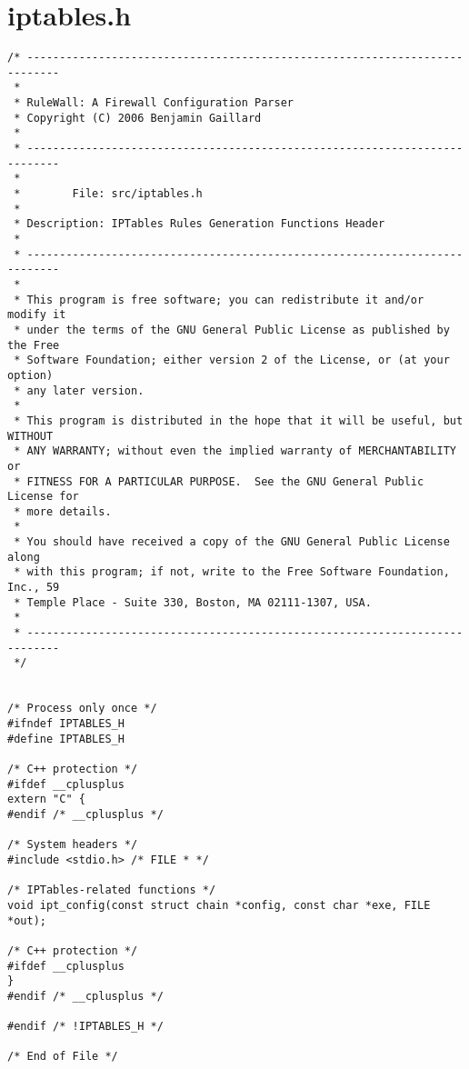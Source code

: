 \documentclass[a4paper,landscape,twocolumn,11pt]{article}
\begin{document}
\bigskip\section*{iptables.h}

\begin{lstlisting}
/* ---------------------------------------------------------------------------
 *
 * RuleWall: A Firewall Configuration Parser
 * Copyright (C) 2006 Benjamin Gaillard
 *
 * ---------------------------------------------------------------------------
 *
 *        File: src/iptables.h
 *
 * Description: IPTables Rules Generation Functions Header
 *
 * ---------------------------------------------------------------------------
 *
 * This program is free software; you can redistribute it and/or modify it
 * under the terms of the GNU General Public License as published by the Free
 * Software Foundation; either version 2 of the License, or (at your option)
 * any later version.
 *
 * This program is distributed in the hope that it will be useful, but WITHOUT
 * ANY WARRANTY; without even the implied warranty of MERCHANTABILITY or
 * FITNESS FOR A PARTICULAR PURPOSE.  See the GNU General Public License for
 * more details.
 *
 * You should have received a copy of the GNU General Public License along
 * with this program; if not, write to the Free Software Foundation, Inc., 59
 * Temple Place - Suite 330, Boston, MA 02111-1307, USA.
 *
 * ---------------------------------------------------------------------------
 */


/* Process only once */
#ifndef IPTABLES_H
#define IPTABLES_H

/* C++ protection */
#ifdef __cplusplus
extern "C" {
#endif /* __cplusplus */

/* System headers */
#include <stdio.h> /* FILE * */

/* IPTables-related functions */
void ipt_config(const struct chain *config, const char *exe, FILE *out);

/* C++ protection */
#ifdef __cplusplus
}
#endif /* __cplusplus */

#endif /* !IPTABLES_H */

/* End of File */
\end{lstlisting}
\end{document}

